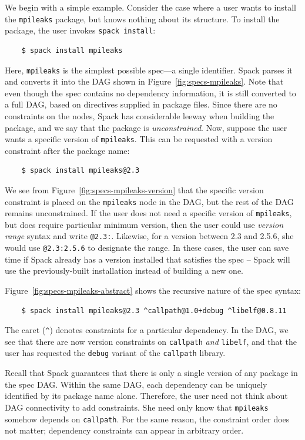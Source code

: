 We begin with a simple example.
Consider the case where a user wants to install the {\tt mpileaks} package, but knows
nothing about its structure.  To install the package, the user invokes {\tt spack install}:
%
\begin{verbatim}
    $ spack install mpileaks
\end{verbatim}
%
Here, {\tt mpileaks} is the simplest possible spec---a single identifier.
Spack parses it and converts it into the DAG shown in Figure~\ref{fig:specs-mpileaks}.
Note that even though the spec contains no dependency information, it is still
converted to a full DAG, based on directives supplied in package files. Since there
are no constraints on the nodes, Spack has considerable leeway when building the
package, and we say that the package is {\it unconstrained}.
%
Now, suppose the user wants a specific version of {\tt mpileaks}.  This can be requested
with a version constraint after the package name:
%
\begin{verbatim}
    $ spack install mpileaks@2.3
\end{verbatim}
%
We see from Figure~\ref{fig:specs-mpileaks-version} that the specific version constraint is
placed on the {\tt mpileaks} node in the DAG, but the rest of the DAG remains unconstrained.
If the user does not need a specific version of {\tt mpileaks}, but does require
particular minimum version, then the user could use {\it version range} syntax
and write {\tt @2.3:}.  Likewise, for a version between 2.3 and 2.5.6, she would use
{\tt @2.3:2.5.6} to designate the range. In these cases, the user can save time if
Spack already has a version installed that satisfies the spec -- Spack will use
the previously-built installation instead of building a new one.

Figure~\ref{fig:specs-mpileaks-abstract} shows the recursive nature of the spec syntax:
%
\begin{verbatim}
    $ spack install mpileaks@2.3 ^callpath@1.0+debug ^libelf@0.8.11
\end{verbatim}
%
The caret (\verb|^|) denotes constraints for a particular dependency.  In the DAG,
we see that there are now version constraints on {\tt callpath} {\it and} {\tt libelf},
and that the user has requested the {\tt debug} variant of the {\tt callpath} library.

Recall that Spack guarantees that there is only a single version of any package in
the spec DAG.  Within the same DAG, each dependency can be uniquely
identified by its package name alone.  Therefore, the user need not think about DAG 
connectivity to add constraints.  She need only know that {\tt mpileaks}
somehow depends on {\tt callpath}.
For the same reason, the constraint order does not matter; dependency constraints
can appear in arbitrary order.

